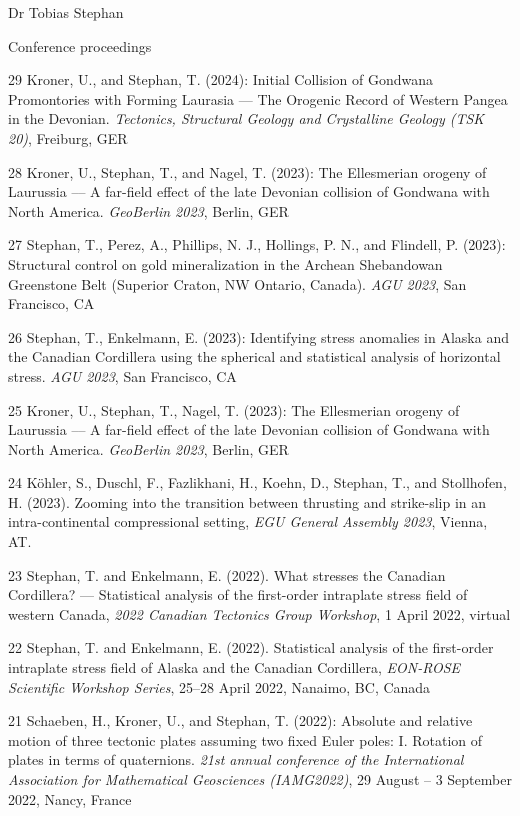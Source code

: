 \documentclass[10pt, paper=letter]{scrartcl} %
\begin{document}
\begin{cv}{Dr Tobias Stephan}
\begin{cvlist}{Conference proceedings}
     \item[29] Kroner, U., and Stephan, T. (2024): Initial Collision of Gondwana Promontories with Forming Laurasia --- The Orogenic Record of Western Pangea in the Devonian. \textit{Tectonics, Structural Geology and Crystalline Geology (TSK 20)}, Freiburg, GER
     \item[28] Kroner, U., Stephan, T., and Nagel, T. (2023): The Ellesmerian orogeny of Laurussia –-- A far-field effect of the late Devonian collision of Gondwana with North America. \textit{GeoBerlin 2023}, Berlin, GER
    \item[27] Stephan, T., Perez, A., Phillips, N. J., Hollings, P. N., and Flindell, P. (2023): Structural control on gold mineralization in the Archean Shebandowan Greenstone Belt (Superior Craton, NW Ontario, Canada). \textit{AGU 2023}, San Francisco, CA
    \item[26] Stephan, T., Enkelmann, E. (2023): Identifying stress anomalies in Alaska and the Canadian Cordillera using the spherical and statistical analysis of horizontal stress. \textit{AGU 2023}, San Francisco, CA
    \item[25] Kroner, U., Stephan, T., Nagel, T. (2023): The Ellesmerian orogeny of Laurussia –-- A far-field effect of the late Devonian collision of Gondwana with North America. \textit{GeoBerlin 2023}, Berlin, GER
    \item[24] K\"ohler, S., Duschl, F., Fazlikhani, H., Koehn, D., Stephan, T., and Stollhofen, H. (2023).  Zooming into the transition between thrusting and strike-slip in an intra-continental compressional setting, \textit{EGU General Assembly 2023}, Vienna, AT. 
    \item[23] Stephan, T. and Enkelmann, E. (2022). What stresses the Canadian Cordillera? --- Statistical analysis of the first-order intraplate stress field of western Canada, \textit{2022 Canadian Tectonics Group Workshop}, 1 April 2022, virtual
    \item[22] Stephan, T. and Enkelmann, E. (2022). Statistical analysis of the first-order intraplate stress field of Alaska and the Canadian Cordillera, \textit{EON-ROSE Scientific Workshop Series}, 25--28 April 2022, Nanaimo, BC, Canada
    \item[21] Schaeben, H., Kroner, U., and Stephan, T. (2022): Absolute and relative motion of three tectonic plates assuming two fixed Euler poles: I. Rotation of plates in terms of quaternions. \textit{21st annual conference of the International Association for Mathematical Geosciences (IAMG2022)}, 29 August -- 3 September 2022, Nancy, France

\end{cvlist}
\end{cv}
\end{document}
